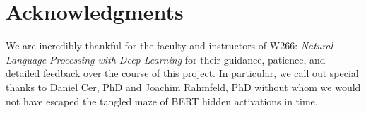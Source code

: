\section*{Acknowledgments}

We are incredibly thankful for the faculty and instructors of W266: \textit{Natural Language Processing with Deep Learning} for their guidance, patience, and detailed feedback over the course of this project. In particular, we call out special thanks to Daniel Cer, PhD and Joachim Rahmfeld, PhD without whom we would not have escaped the tangled maze of BERT hidden activations in time.
